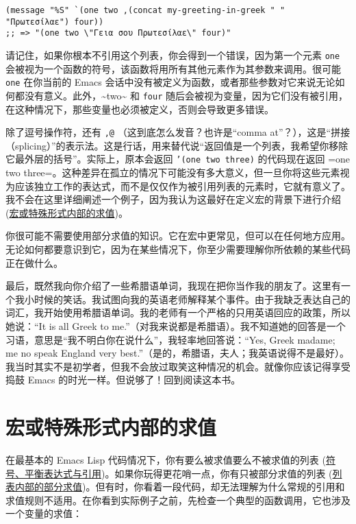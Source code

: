 \documentclass[11pt]{ctexart}
\begin{document}
\begin{verbatim}
(message "%S" `(one two ,(concat my-greeting-in-greek " " "Πρωτεσίλαε") four))
;; => "(one two \"Γεια σου Πρωτεσίλαε\" four)"
\end{verbatim}

请记住，如果你根本不引用这个列表，你会得到一个错误，因为第一个元素 \texttt{one} 会被视为一个函数的符号，该函数将用所有其他元素作为其参数来调用。很可能 \texttt{one} 在你当前的 Emacs 会话中没有被定义为函数，或者那些参数对它来说无论如何都没有意义。此外，\textasciitilde{}two\textasciitilde{} 和 \texttt{four} 随后会被视为变量，因为它们没有被引用，在这种情况下，那些变量也必须被定义，否则会导致更多错误。

除了逗号操作符，还有 \texttt{,@} （这到底怎么发音？也许是“comma at”？），这是“拼接（splicing）”的表示法。这是行话，用来替代说“返回值是一个列表，我希望你移除它最外层的括号”。实际上，原本会返回 \texttt{'(one two three)} 的代码现在返回 =one two three=。这种差异在孤立的情况下可能没有多大意义，但一旦你将这些元素视为应该独立工作的表达式，而不是仅仅作为被引用列表的元素时，它就有意义了。我不会在这里详细阐述一个例子，因为我认为这最好在定义宏的背景下进行介绍 (\hyperref[sec:org6bfc8f0]{宏或特殊形式内部的求值})。

你很可能不需要使用部分求值的知识。它在宏中更常见，但可以在任何地方应用。无论如何都要意识到它，因为在某些情况下，你至少需要理解你所依赖的某些代码正在做什么。

最后，既然我向你介绍了一些希腊语单词，我现在把你当作我的朋友了。这里有一个我小时候的笑话。我试图向我的英语老师解释某个事件。由于我缺乏表达自己的词汇，我开始使用希腊语单词。我的老师有一个严格的只用英语回应的政策，所以她说：“It is all Greek to me.”（对我来说都是希腊语）。我不知道她的回答是一个习语，意思是“我不明白你在说什么”，我轻率地回答说：“Yes, Greek madame; me no speak England very best.”（是的，希腊语，夫人；我英语说得不是最好）。我当时其实不是初学者，但我不会放过取笑这种情况的机会。就像你应该记得享受捣鼓 Emacs 的时光一样。但说够了！回到阅读这本书。
\section{宏或特殊形式内部的求值}
\label{sec:org6bfc8f0}
在最基本的 Emacs Lisp 代码情况下，你有要么被求值要么不被求值的列表 (\hyperref[sec:orgb51d706]{符号、平衡表达式与引用})。如果你玩得更花哨一点，你有只被部分求值的列表 (\hyperref[sec:org7fa9c71]{列表内部的部分求值})。但有时，你看着一段代码，却无法理解为什么常规的引用和求值规则不适用。在你看到实际例子之前，先检查一个典型的函数调用，它也涉及一个变量的求值：
\end{document}
